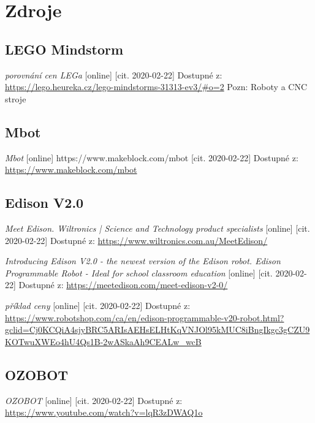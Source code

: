 \documentclass{template/socthesis}
\begin{document}
\chapter*{Zdroje}
\begin{thebibliography}{1}
	
	\section{LEGO Mindstorm}
	
	\textit{porovnání cen LEGa} [online]  [cit. 2020-02-22] Dostupné z: \\ 
	\url{https://lego.heureka.cz/lego-mindstorms-31313-ev3/#o=2}
	{\footnotesize Pozn: Roboty a CNC stroje}
	
	
	\section{Mbot}
	\textit{Mbot} [online] https://www.makeblock.com/mbot [cit. 2020-02-22] Dostupné z: \url{https://www.makeblock.com/mbot}
	
	
	\section{Edison V2.0}
	\textit{Meet Edison. Wiltronics | Science and Technology product specialists} [online] [cit. 2020-02-22] Dostupné z: \url{https://www.wiltronics.com.au/MeetEdison/}
	
	\textit{Introducing Edison V2.0 - the newest version of the Edison robot. Edison Programmable Robot - Ideal for school classroom education} [online] [cit. 2020-02-22] Dostupné z:
	\url{https://meetedison.com/meet-edison-v2-0/}
	 
	\textit{příklad ceny} [online] [cit. 2020-02-22] Dostupné z: \\ 
	\url{https://www.robotshop.com/ca/en/edison-programmable-v20-robot.html?gclid=Cj0KCQiA4sjyBRC5ARIsAEHsELHtKqVNJOl95kMUC8iBngIkgc3gCZU9KOTwuXWEo4hU4Qs1B-2wASkaAh9CEALw_wcB}
	
	\section{OZOBOT}
	
	\textit{OZOBOT} [online] [cit. 2020-02-22] Dostupné z:
	\url{https://www.youtube.com/watch?v=lqR3zDWAQ1o}
	

\end{thebibliography}
\end{document}
